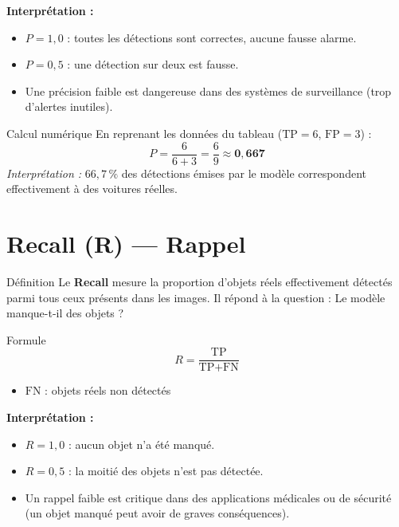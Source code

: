 \documentclass[12pt, a4paper]{report}
\newcommand{\tp}{\text{TP}}
\newcommand{\fp}{\text{FP}}
\newcommand{\fn}{\text{FN}}
\begin{document}
\textbf{Interprétation :}
\begin{itemize}
  \item $P = 1{,}0$ : toutes les détections sont correctes, aucune fausse alarme.
  \item $P = 0{,}5$ : une détection sur deux est fausse.
  \item Une précision faible est dangereuse dans des systèmes de surveillance
        (trop d'alertes inutiles).
\end{itemize}

\begin{examplebox}{Calcul numérique}
  En reprenant les données du tableau ($\tp=6$, $\fp=3$) :
  \[
    P = \frac{6}{6 + 3} = \frac{6}{9} \approx \mathbf{0{,}667}
  \]
  \textit{Interprétation :} $66{,}7\,\%$ des détections émises par le modèle
  correspondent effectivement à des voitures réelles.
\end{examplebox}

\section{Recall (R) — Rappel}

\begin{definitionbox}{Définition}
  Le \textbf{Recall} mesure la proportion d'objets réels effectivement détectés
  parmi tous ceux présents dans les images. Il répond à la question :
  \og Le modèle manque-t-il des objets ? \fg
\end{definitionbox}

\begin{formulebox}{Formule}
  \[
    R = \frac{\tp}{\tp + \fn}
  \]
  \begin{itemize}
    \item $\fn$ : objets réels non détectés
  \end{itemize}
\end{formulebox}

\textbf{Interprétation :}
\begin{itemize}
  \item $R = 1{,}0$ : aucun objet n'a été manqué.
  \item $R = 0{,}5$ : la moitié des objets n'est pas détectée.
  \item Un rappel faible est critique dans des applications médicales ou de
        sécurité (un objet manqué peut avoir de graves conséquences).
\end{itemize}
\end{document}
